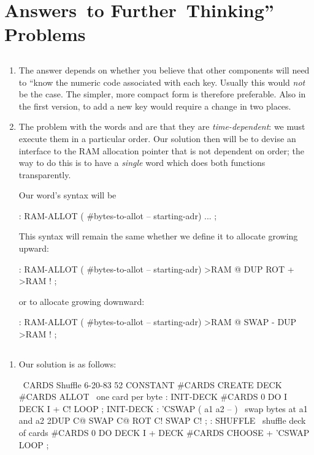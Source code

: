 
\chapter{Answers~to
Further~Thinking''
Problems}
\section{}
\begin{enumerate}
\item The answer depends on whether you believe that other components will
need to ``know the numeric code associated with each key.  Usually this
would \emph{not} be the case.  The simpler, more compact form is therefore
preferable.  Also in the first version, to add a new key would require a
change in two places.
\item The problem with the words  and  are
that they are \emph{time-dependent}:  we must execute them in a particular
order.  Our solution then will be to devise an interface to the RAM
allocation pointer that is not dependent on order; the way to do this is
to have a \emph{single} word which does both functions transparently.

Our word's syntax will be
\begin{Code}
: RAM-ALLOT   ( #bytes-to-allot -- starting-adr) 
    ... ;
\end{Code}
This syntax will remain the same whether we define it to allocate growing 
upward:
\begin{Code}
: RAM-ALLOT  ( #bytes-to-allot -- starting-adr)
    >RAM @  DUP ROT +  >RAM ! ;
\end{Code}
or to allocate growing downward:
\begin{Code}
: RAM-ALLOT  ( #bytes-to-allot -- starting-adr)
    >RAM @  SWAP -  DUP >RAM ! ;
\end{Code}
\end{enumerate}

\section{}

\ifeightyfour\begin{enumerate}
\item\fi Our solution is as follows:
\begin{Code}
\ CARDS               Shuffle                6-20-83
52 CONSTANT #CARDS
CREATE DECK  #CARDS ALLOT   \   one card per byte
: INIT-DECK
   #CARDS 0 DO  I  DECK I + C!  LOOP ;
INIT-DECK
: 'CSWAP  ( a1 a2 -- )  \  swap bytes at a1 and a2
   2DUP C@  SWAP C@  ROT C!  SWAP C! ;
: SHUFFLE   \  shuffle deck of cards
   #CARDS 0 DO  DECK I +  DECK  #CARDS CHOOSE +
      'CSWAP  LOOP ;
\end{Code}
\ifeightyfour\end{enumerate}\fi

